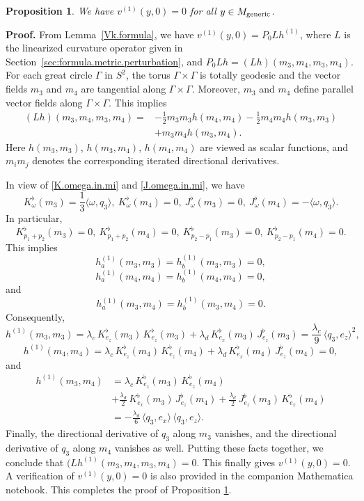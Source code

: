 \documentclass[11pt]{amsart}
\newtheorem{proposition}[theorem]{Proposition}
\theoremstyle{definition}
\begin{document}
\begin{proposition}
\label{first.order.change.in.sectional.curvature}
We have $v^{(1)}(y,0) = 0$ for all $y \in M_{\text{\rm generic}}$.
\end{proposition}

\textbf{Proof.} 
From Lemma~\ref{Vk.formula}, we have $v^{(1)}(y,0)=P_0L h^{(1)}$, where $L$ is the linearized curvature operator given in Section~\ref{sec:formula.metric.perturbation}, and $P_0Lh=(Lh)(m_3,m_4,m_3,m_4)$. For each great circle $\Gamma$ in $S^2$, the torus $\Gamma \times \Gamma$ is totally geodesic and the vector fields $m_3$ and $m_4$ are tangential along $\Gamma \times \Gamma$. Moreover, $m_3$ and $m_4$ define parallel vector fields along $\Gamma \times \Gamma$. This implies
\begin{align*}
(Lh)(m_3,m_4,m_3,m_4) = &-\frac{1}{2}m_3m_3h(m_4,m_4)-\frac{1}{2}m_4m_4h(m_3,m_3) \\ 
&+m_3m_4 h(m_3,m_4).
\end{align*}
Here $h(m_3,m_3)$, $h(m_3,m_4)$, $h(m_4,m_4)$ are viewed as scalar functions, and $m_im_j$ denotes the corresponding iterated directional derivatives.

In view of \eqref{K.omega.in.mi} and \eqref{J.omega.in.mi}, we have
\[
K^\flat_\omega(m_3)=\frac{1}{3}\langle \omega, q_3\rangle,\ K^\flat_\omega(m_4)=0,\ J^\flat_\omega(m_3)=0,\ J^\flat_\omega(m_4)=-\langle \omega, q_3\rangle.
\]
In particular,
\[
K^\flat_{p_1+p_2}(m_3)=0,\ K^\flat_{p_1+p_2}(m_4)=0,\ K^\flat_{p_2-p_1}(m_3)=0,\ K^\flat_{p_2-p_1}(m_4)=0. 
\] 
This implies 
\[h^{(1)}_a(m_3,m_3) = h^{(1)}_b(m_3,m_3) = 0,\] 
\[h^{(1)}_a(m_4,m_4) = h^{(1)}_b(m_4,m_4) = 0,\] 
and 
\[h^{(1)}_a(m_3,m_4) = h^{(1)}_b(m_3,m_4) = 0.\]
Consequently, 
\[h^{(1)}(m_3,m_3) = \lambda_c \, K^\flat_{e_z}(m_3) \, K^\flat_{e_z}(m_3) + \lambda_d \, K^\flat_{e_x}(m_3) \, J^\flat_{e_z}(m_3) = \frac{\lambda_c}{9} \, \langle q_3,e_z \rangle^2,\] 
\[h^{(1)}(m_4,m_4) = \lambda_c \, K^\flat_{e_z}(m_4) \, K^\flat_{e_z}(m_4) + \lambda_d \, K^\flat_{e_x}(m_4) \, J^\flat_{e_z}(m_4) = 0,\] 
and 
\begin{align*} 
h^{(1)}(m_3,m_4) 
&= \lambda_c \, K^\flat_{e_z}(m_3) \, K^\flat_{e_z}(m_4) \\ 
&+ \frac{\lambda_d}{2} \, K^\flat_{e_x}(m_3) \, J^\flat_{e_z}(m_4) + \frac{\lambda_d}{2} \, J^\flat_{e_z}(m_3) \, K^\flat_{e_x}(m_4) \\ 
&= -\frac{\lambda_d}{6} \, \langle q_3,e_x \rangle \, \langle q_3,e_z \rangle. 
\end{align*}
Finally, the directional derivative of $q_3$ along $m_3$ vanishes, and the directional derivative of $q_3$ along $m_4$ vanishes as well. Putting these facts together, we conclude that $(Lh^{(1)}(m_3,m_4,m_3,m_4) = 0$. This finally gives $v^{(1)}(y,0)=0$. A verification of $v^{(1)}(y,0)=0$ is also provided in the companion Mathematica notebook. This completes the proof of Proposition \ref{first.order.change.in.sectional.curvature}. \\
\end{document}
